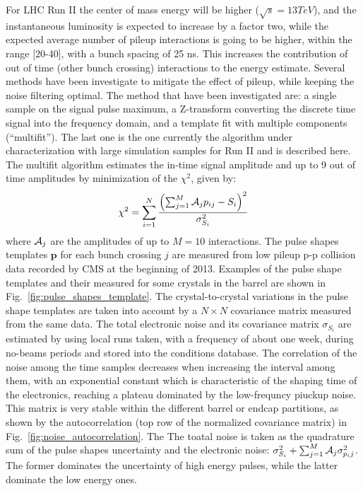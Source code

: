 \documentclass[journal]{IEEEtran}
\begin{document}
For LHC Run II the center of mass energy will be higher ($\sqrt{s}=13 TeV$), and the instantaneous luminosity is expected to increase by a factor two, while the expected average number of pileup interactions is going to be higher, within the range [20-40], with a bunch spacing of 25 ns. This increases the contribution of out of time (other bunch crossing) interactions to the energy estimate. Several methods have been investigate to mitigate the effect of pileup, while keeping the noise filtering optimal. The method that have been investigated are: a single sample on the signal pulse maximum, a Z-transform converting the discrete time signal into the frequency domain, and a template fit with multiple components (``multifit''). The last one is the one currently the algorithm under characterization with large simulation samples for Run II and is described here.
The multifit algorithm estimates the in-time signal amplitude and up to 9 out of time amplitudes by minimization of the $\chi^2$, given by:
\begin{equation}
\chi^2 = \sum_{i=1}^{N} \frac{\left(\sum_{j=1}^M {\cal A}_{j}p_{ij} - S_i \right)^2}{\sigma^2_{S_i}}
\end{equation}
where ${\cal A}_{j}$ are the amplitudes of up to $M=10$ interactions. The pulse shapes templates $\mathbf p$ for each bunch crossing $j$ are measured from low pileup p-p collision data recorded by CMS at the beginning of 2013. Examples of the pulse shape templates and their measured for some crystals in the barrel are shown in Fig.~\ref{fig:pulse_shapes_template}. The crystal-to-crystal variations in the pulse shape templates are taken into account by a $N \times N$ covariance matrix measured from the same data. The total electronic noise and its covariance matrix $\sigma_{S_i}$ are estimated by using local runs taken, with a frequency of about one week, during no-beams periods and stored into the conditions database. The correlation of the noise among the time samples decreases when increasing the interval among them, with an exponential constant which is characteristic of the shaping time of the electronics, reaching a plateau dominated by the low-frequncy piuckup noise. This matrix is very stable within the different barrel or endcap partitions, as shown by the autocorrelation (top row of the normalized covariance matrix) in Fig.~\ref{fig:noise_autocorrelation}. The  The toatal noise is taken as the quadrature sum of the pulse shapes uncertainty and the electronic noise: $\sigma_{S_i}^2+\sum_{j=1}^M {\cal A}_{j}\sigma_{p_ij}^2$. The former dominates the uncertainty of high energy pulses, while the latter dominate the low energy ones.
\end{document}
